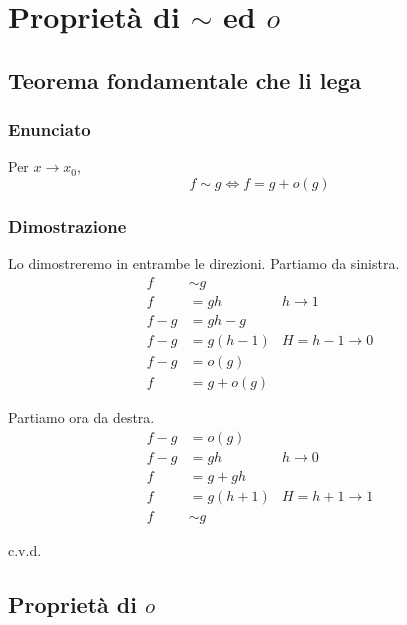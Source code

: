 \documentclass[../../dimostrazioni]{subfiles}
\begin{document}
    \chapter{Proprietà di \texorpdfstring{\(\sim\) ed \(o\)}{asintotico ed o-piccolo}}

        \section*{Teorema fondamentale che li lega}

            \subsection*{Enunciato}

                Per \(x \to x_0\),
                \[
                    f \sim g \iff f = g + o(g)
                \]

            \subsection*{Dimostrazione}

                Lo dimostreremo in entrambe le direzioni. Partiamo da sinistra.
                \begin{align*}
                    f &\sim g\\
                    f &= gh & h \to 1\\
                    f - g &= gh - g\\
                    f - g &= g (h - 1) & H = h - 1 \to 0\\
                    f - g &= o(g)\\
                    f &= g + o(g)
                \end{align*}

                Partiamo ora da destra.
                \begin{align*}
                    f - g &= o(g)\\
                    f - g &= gh & h \to 0\\
                    f &= g + gh\\
                    f &= g (h + 1) & H = h + 1 \to 1\\
                    f &\sim g
                \end{align*}
                
                c.v.d.

        \section*{Proprietà di \(o\)}
\end{document}
